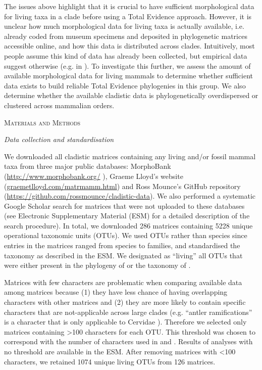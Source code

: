 \documentclass[12pt,letterpaper]{article}
\renewcommand{\section}[1]{%
\bigskip
\begin{center}
\begin{Large}
\normalfont\scshape #1
\medskip
\end{Large}
\end{center}}
\renewcommand{\subsection}[1]{%
\bigskip
\begin{center}
\begin{large}
\normalfont\itshape #1
\end{large}
\end{center}}
\begin{document}
The issues above highlight that it is crucial to have sufficient morphological data for living taxa in a clade before using a Total Evidence approach.
However, it is unclear how much morphological data for living taxa is actually available, i.e. already coded from museum specimens and deposited in phylogenetic matrices accessible online, and how this data is distributed across clades.
Intuitively, most people assume this kind of data has already been collected, but empirical data suggest otherwise (e.g. in \cite{ronquista2012,slaterphylogenetic2013,beckancient2014}).
To investigate this further, we assess the amount of available morphological data for living mammals to determine whether sufficient data exists to build reliable Total Evidence phylogenies in this group.
We also determine whether the available cladistic data is phylogenetically overdispersed or clustered across mammalian orders.

%
%
\section{Materials and Methods}
\subsection{Data collection and standardisation}
We downloaded all cladistic matrices containing any living and/or fossil mammal taxa from three major public databases: MorphoBank (\url{http://www.morphobank.org/} \cite{morphobank}), Graeme Lloyd's website (\url{graemetlloyd.com/matrmamm.html}) and Ross Mounce's GitHub repository (\url{https://github.com/rossmounce/cladistic-data}).
We also performed a systematic Google Scholar search for matrices that were not uploaded to these databases (see Electronic Supplementary Material (ESM) for a detailed description of the search procedure).
In total, we downloaded 286 matrices containing 5228 unique operational taxonomic units (OTUs). 
We used OTUs rather than species since entries in the matrices ranged from species to families, and standardised the taxonomy as described in the ESM. 
We designated as ``living'' all OTUs that were either present in the phylogeny of \cite{BinindaEmonds} or the taxonomy of \cite{wilson2005mammal}.

Matrices with few characters are problematic when comparing available data among matrices because (1) they have less chance of having overlapping characters with other matrices \cite{wagner2000} and (2) they are more likely to contain specific characters that are not-applicable across large clades (e.g. ``antler ramifications'' is a character that is only applicable to Cervidae \cite{Brazeau2011}).
Therefore we selected only matrices containing \textgreater 100 characters for each OTU.
This threshold was chosen to correspond with the number of characters used in \cite{GuillermeCooper} and \cite{harrisonamong-character2014}.
Results of analyses with no threshold are available in the ESM. 
After removing matrices with \textless 100 characters, we retained 1074 unique living OTUs from 126 matrices. %
\end{document}
